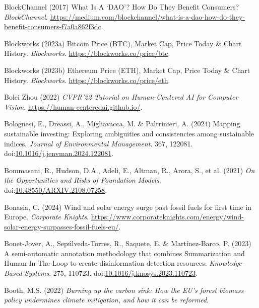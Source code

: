 \documentclass[
  letterpaper,
  DIV=11,
  numbers=noendperiod]{scrartcl}
\newlength{\cslhangindent}
\newenvironment{CSLReferences}[2] %
 {\begin{list}{}{%
  \setlength{\itemindent}{0pt}
  \setlength{\leftmargin}{0pt}
  \setlength{\parsep}{0pt}
  \ifodd #1
   \setlength{\leftmargin}{\cslhangindent}
   \setlength{\itemindent}{-1\cslhangindent}
  \fi
  \setlength{\itemsep}{#2\baselineskip}}}
 {\end{list}}
\begin{document}
\begin{CSLReferences}{0}{1}
BlockChannel (2017) What {Is A} {`{DAO}'}? {How Do They Benefit
Consumers}? \emph{BlockChannel}.
\url{https://medium.com/blockchannel/what-is-a-dao-how-do-they-benefit-consumers-f7a0a862f3dc}.

Blockworks (2023a) Bitcoin {Price} ({BTC}), {Market Cap}, {Price Today}
\& {Chart History}. \emph{Blockworks}.
\url{https://blockworks.co/price/btc}.

Blockworks (2023b) Ethereum {Price} ({ETH}), {Market Cap}, {Price Today}
\& {Chart History}. \emph{Blockworks}.
\url{https://blockworks.co/price/eth}.

Bolei Zhou (2022) \emph{{CVPR}'22 {Tutorial} on {Human-Centered AI} for
{Computer Vision}}. \url{https://human-centeredai.github.io/}.

Bolognesi, E., Dreassi, A., Migliavacca, M. \& Paltrinieri, A. (2024)
Mapping sustainable investing: {Exploring} ambiguities and consistencies
among sustainable indices. \emph{Journal of Environmental Management}.
367, 122081.
doi:\href{https://doi.org/10.1016/j.jenvman.2024.122081}{10.1016/j.jenvman.2024.122081}.

Bommasani, R., Hudson, D.A., Adeli, E., Altman, R., Arora, S., et al.
(2021) \emph{On the {Opportunities} and {Risks} of {Foundation Models}}.
doi:\href{https://doi.org/10.48550/ARXIV.2108.07258}{10.48550/ARXIV.2108.07258}.

Bonasia, C. (2024) Wind and solar energy surge past fossil fuels for
first time in {Europe}. \emph{Corporate Knights}.
\url{https://www.corporateknights.com/energy/wind-solar-energy-surpasses-fossil-fuels-eu/}.

Bonet-Jover, A., Sepúlveda-Torres, R., Saquete, E. \& Martínez-Barco, P.
(2023) A semi-automatic annotation methodology that combines
{Summarization} and {Human-In-The-Loop} to create disinformation
detection resources. \emph{Knowledge-Based Systems}. 275, 110723.
doi:\href{https://doi.org/10.1016/j.knosys.2023.110723}{10.1016/j.knosys.2023.110723}.

Booth, M.S. (2022) \emph{Burning up the carbon sink: {How} the {EU}'s
forest biomass policy undermines climate mitigation, and how it can be
reformed}.


\end{CSLReferences}
\end{document}
